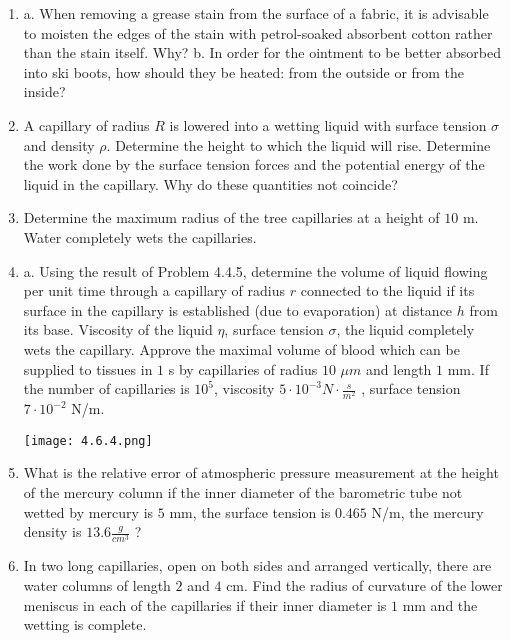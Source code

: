 \documentclass{article}
\begin{document}
\begin{enumerate}[label=4.6.\arabic*]

\item a. When removing a grease stain from the surface of a fabric, it is advisable to moisten the edges of the stain with petrol-soaked absorbent cotton rather than the stain itself. Why? 
b. In order for the ointment to be better absorbed into ski boots, how should they be heated: from the outside or from the inside? 

\item A capillary of radius $R$ is lowered into a wetting liquid with surface tension $\sigma$ and density $\rho$. Determine the height to which the liquid will rise. Determine the work done by the surface tension forces and the potential energy of the liquid in the capillary. Why do these quantities not coincide?

\item Determine the maximum radius of the tree capillaries at a height of $10$ m. Water completely wets the capillaries. 

\item a. Using the result of Problem 4.4.5, determine the volume of liquid flowing per unit time through a capillary of radius $r$ connected to the liquid if its surface in the capillary is established (due to evaporation) at distance $h$ from its base. Viscosity of the liquid $\eta$, surface tension $\sigma$, the liquid completely wets the capillary. Approve the maximal volume of blood which can be supplied to tissues in $1$ s by capillaries of radius $10$ $\mu m$ and length $1$ mm. If the number of capillaries is $10^5$, viscosity $5 \cdot 10^{-3} N \cdot \frac{s}{m^2}$ , surface tension $7 \cdot 10^{-2}$ N/m.

\begin{center}
    \texttt{[image: 4.6.4.png]}
\end{center}

\item What is the relative error of atmospheric pressure measurement at the height of the mercury column if the inner diameter of the barometric tube not wetted by mercury is $5$ mm, the surface tension is $0.465$ N/m, the mercury density is $13.6 \frac{g}{cm^3}$ ?   

\item In two long capillaries, open on both sides and arranged vertically, there are water columns of length $2$ and $4$ cm. Find the radius of curvature of the lower meniscus in each of the capillaries if their inner diameter is $1$ mm and the wetting is complete.   


\end{enumerate}
\end{document}
